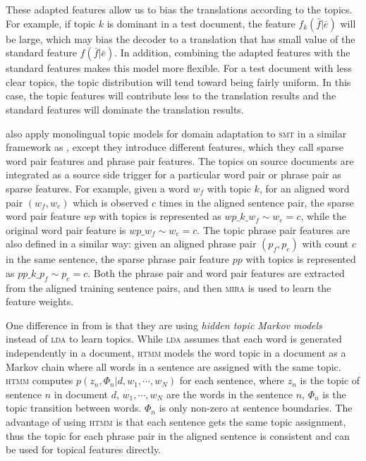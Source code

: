These adapted features allow us to bias the translations according to
the topics. For example, if topic $k$ is dominant in a test document,
the feature $f_k(\bar{f} | \bar{e})$ will be large, which may bias the
decoder to a translation that has small value of the standard feature
$f(\bar{f}|\bar{e})$. In addition, combining the adapted features with
the standard features makes this model more flexible. For a test
document with less clear topics, the topic distribution will tend
toward being fairly uniform. In this case, the topic features will
contribute less to the translation results and the standard features
will dominate the translation results.


\citet{hasler-12} also apply monolingual topic models for domain adaptation to
\textsc{smt} in a similar framework as \citet{Eidelman-12}, except
they introduce different features, which they call sparse word pair
features and phrase pair features. The topics on source documents are
integrated as a source side trigger for a particular word pair or
phrase pair as sparse features. For example, given a word $w_f$ with
topic $k$, for an aligned word pair $(w_f, w_e)$ which is observed $c$
times in the aligned sentence pair, the sparse word pair feature $wp$
with topics is represented as $wp\_k\_w_f \sim w_e = c$, while the
original word pair feature is $wp\_w_f \sim w_e = c$. The topic phrase
pair features are also defined in a similar way: given an aligned
phrase pair $(p_f, p_e)$ with count $c$ in the same sentence, the
sparse phrase pair feature $pp$ with topics is represented as
$pp\_k\_p_f \sim p_e = c$. Both the phrase pair and word pair features
are extracted from the aligned training sentence pairs, and then
\textsc{mira} is used to learn the feature weights.

One difference in \citet{hasler-12} from \citet{Eidelman-12} is that
they are using \emph{hidden topic Markov
  models}~\citep[\textsc{htmm}]{gruber-07} instead of \textsc{lda} to
learn topics. While \textsc{lda} assumes that each word is generated
independently in a document, \textsc{htmm} models the word topic in a
document as a Markov chain where all words in a sentence are assigned
with the same topic. \textsc{htmm} computes $p(z_n, \Phi_n | d, w_1,
\cdots, w_N)$ for each sentence, where $z_n$ is the topic of sentence
$n$ in document $d$, $w_1, \cdots, w_N$ are the words in the sentence
$n$, $\Phi_n$ is the topic transition between words. $\Phi_n$ is only
non-zero at sentence boundaries. The advantage of using \textsc{htmm}
is that each sentence gets the same topic assignment, thus the topic
for each phrase pair in the aligned sentence is consistent and can be
used for topical features directly.


